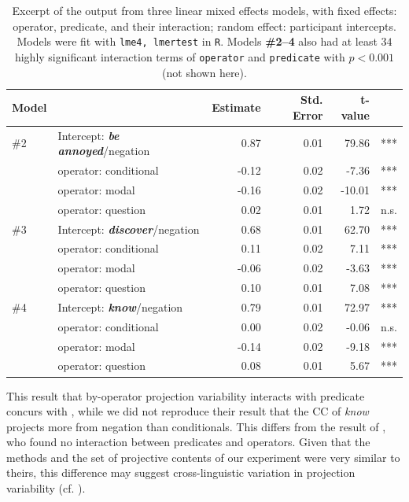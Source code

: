 \documentclass[a4paper,12pt,twoside]{article}
\begin{document}
			\begin{table}[ht]
				\centering
				\begin{tabular}{llrrrr}
					Model & & Estimate & Std. Error & t-value\\
					\midrule
					\#2 & Intercept: \emph{\bf be annoyed}/negation & 0.87 & 0.01 & 79.86 & ***\\
					& operator: conditional & -0.12 & 0.02  & -7.36 & ***\\
					& operator: modal & -0.16 & 0.02  & -10.01 & ***\\
					& operator: question & 0.02 & 0.01 & 1.72 & n.s.\\
					\midrule
					\#3 & Intercept: \emph{\bf discover}/negation & 0.68 & 0.01 & 62.70 & ***\\
					& operator: conditional & 0.11 & 0.02 & 7.11 & ***\\
					& operator: modal & -0.06 & 0.02 & -3.63 & ***\\
					& operator: question & 0.10 & 0.01 & 7.08 & ***\\
					\midrule
					\#4 & Intercept: \emph{\bf know}/negation & 0.79 & 0.01 & 72.97 & ***\\
					& operator: conditional & 0.00 & 0.02 & -0.06 & n.s.\\
					& operator: modal & -0.14 & 0.02 & -9.18 & ***\\
					& operator: question & 0.08 & 0.01 & 5.67 & ***\\
					\bottomrule
				\end{tabular}
				\caption{\small Excerpt of the output from three linear mixed effects models, with fixed effects: operator, predicate, and their interaction; random effect: participant intercepts.
				Models were fit with \texttt{lme4, lmertest} in \texttt{R}. Models \textbf{\#2--4} also had at least $34$ highly significant interaction terms of \texttt{operator} and \texttt{predicate} with $p < 0.001$ (not shown here).\label{t:models}}
			\end{table}

			This result that by-operator projection variability interacts with predicate concurs with \citet{smith_relationship_2014}, while we did not reproduce their result that the CC of \emph{know} projects more from negation than conditionals. This differs from the result of \citet{sieker_projective_2022}, who found no interaction between predicates and operators.
			Given that the methods and the set of projective contents of our experiment were very similar to theirs, this difference may suggest cross-linguistic variation in projection variability (cf. \citealt{tonhauser_projection_2020}).
\end{document}

